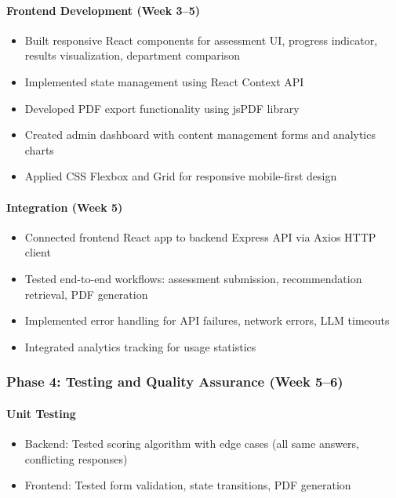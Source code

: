 \documentclass[12pt, a4paper]{article}
\begin{document}
\paragraph{Frontend Development (Week 3--5)}
\begin{itemize}[leftmargin=1.5em, itemsep=3pt]
    \item Built responsive React components for assessment UI, progress indicator, results visualization, department comparison
    \item Implemented state management using React Context API
    \item Developed PDF export functionality using jsPDF library
    \item Created admin dashboard with content management forms and analytics charts
    \item Applied CSS Flexbox and Grid for responsive mobile-first design
\end{itemize}

\paragraph{Integration (Week 5)}
\begin{itemize}[leftmargin=1.5em, itemsep=3pt]
    \item Connected frontend React app to backend Express API via Axios HTTP client
    \item Tested end-to-end workflows: assessment submission, recommendation retrieval, PDF generation
    \item Implemented error handling for API failures, network errors, LLM timeouts
    \item Integrated analytics tracking for usage statistics
\end{itemize}

\subsubsection*{Phase 4: Testing and Quality Assurance (Week 5--6)}

\paragraph{Unit Testing}
\begin{itemize}[leftmargin=1.5em, itemsep=3pt]
    \item Backend: Tested scoring algorithm with edge cases (all same answers, conflicting responses)
    \item Frontend: Tested form validation, state transitions, PDF generation
\end{itemize}
\end{document}
